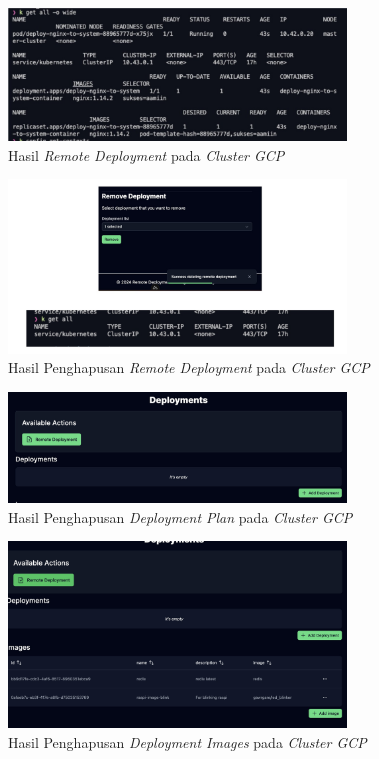 \begin{figure}[ht]
  \centering
  \includegraphics[width=0.8\textwidth]{resources/chapter-4/pengujian/pengujian-sistem-gcp-06.jpg}
  \caption{Hasil \textit{Remote Deployment} pada \textit{Cluster GCP}}
  \label{fig:pengujian-sistem-gcp-06}
\end{figure}

\begin{figure}[ht]
  \centering
  \includegraphics[width=0.8\textwidth]{resources/chapter-4/pengujian/pengujian-sistem-gcp-07.jpg}
  \caption{Hasil Penghapusan \textit{Remote Deployment} pada \textit{Cluster GCP}}
  \label{fig:pengujian-sistem-gcp-07}
\end{figure}

\begin{figure}[ht]
  \centering
  \includegraphics[width=0.8\textwidth]{resources/chapter-4/pengujian/pengujian-sistem-gcp-08.jpg}
  \caption{Hasil Penghapusan \textit{Deployment Plan} pada \textit{Cluster GCP}}
  \label{fig:pengujian-sistem-gcp-08}
\end{figure}

\begin{figure}[ht]
  \centering
  \includegraphics[width=0.8\textwidth]{resources/chapter-4/pengujian/pengujian-sistem-gcp-09.jpg}
  \caption{Hasil Penghapusan \textit{Deployment Images} pada \textit{Cluster GCP}}
  \label{fig:pengujian-sistem-gcp-09}
\end{figure}